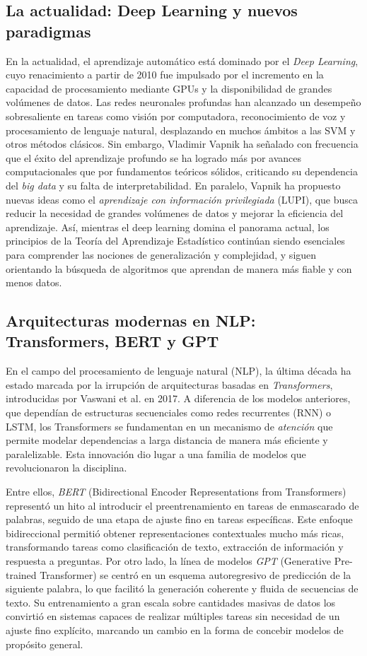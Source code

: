 \documentclass{report}
\begin{document}
\subsection{La actualidad: Deep Learning y nuevos paradigmas}

En la actualidad, el aprendizaje automático está dominado por el \textit{Deep Learning}, cuyo renacimiento a partir de 2010 fue impulsado por el incremento en la capacidad de procesamiento mediante GPUs y la disponibilidad de grandes volúmenes de datos. Las redes neuronales profundas han alcanzado un desempeño sobresaliente en tareas como visión por computadora, reconocimiento de voz y procesamiento de lenguaje natural, desplazando en muchos ámbitos a las SVM y otros métodos clásicos. Sin embargo, Vladimir Vapnik ha señalado con frecuencia que el éxito del aprendizaje profundo se ha logrado más por avances computacionales que por fundamentos teóricos sólidos, criticando su dependencia del \textit{big data} y su falta de interpretabilidad. En paralelo, Vapnik ha propuesto nuevas ideas como el \textit{aprendizaje con información privilegiada} (LUPI), que busca reducir la necesidad de grandes volúmenes de datos y mejorar la eficiencia del aprendizaje. Así, mientras el deep learning domina el panorama actual, los principios de la Teoría del Aprendizaje Estadístico continúan siendo esenciales para comprender las nociones de generalización y complejidad, y siguen orientando la búsqueda de algoritmos que aprendan de manera más fiable y con menos datos.

\subsection{Arquitecturas modernas en NLP: Transformers, BERT y GPT}

En el campo del procesamiento de lenguaje natural (NLP), la última década ha estado marcada por la irrupción de arquitecturas basadas en \textit{Transformers}, introducidas por Vaswani et al. en 2017. A diferencia de los modelos anteriores, que dependían de estructuras secuenciales como redes recurrentes (RNN) o LSTM, los Transformers se fundamentan en un mecanismo de \textit{atención} que permite modelar dependencias a larga distancia de manera más eficiente y paralelizable. Esta innovación dio lugar a una familia de modelos que revolucionaron la disciplina.

Entre ellos, \textit{BERT} (Bidirectional Encoder Representations from Transformers) representó un hito al introducir el preentrenamiento en tareas de enmascarado de palabras, seguido de una etapa de ajuste fino en tareas específicas. Este enfoque bidireccional permitió obtener representaciones contextuales mucho más ricas, transformando tareas como clasificación de texto, extracción de información y respuesta a preguntas. Por otro lado, la línea de modelos \textit{GPT} (Generative Pre-trained Transformer) se centró en un esquema autoregresivo de predicción de la siguiente palabra, lo que facilitó la generación coherente y fluida de secuencias de texto. Su entrenamiento a gran escala sobre cantidades masivas de datos los convirtió en sistemas capaces de realizar múltiples tareas sin necesidad de un ajuste fino explícito, marcando un cambio en la forma de concebir modelos de propósito general.
\end{document}
